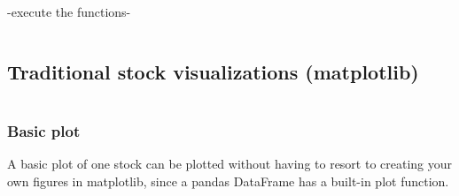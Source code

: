 \documentclass[12pt, a4paper]{article}
\begin{document}

-execute the functions-

\bgroup
  \inputminted[linenos, breaklines=true, fontsize=\scriptsize, firstnumber=last]{python}{src/stocks/etl/3_executing.py}
  \label{listing:setl_3}
\egroup

\newpage
\subsection{Traditional stock visualizations (matplotlib)}


\bgroup
  \inputminted[linenos, breaklines=true, fontsize=\scriptsize, ]{python}{src/stocks/simple/1_get_data.py}
  \label{listing:ssimp_1}
\egroup

\subsubsection{Basic plot}

A basic plot of one stock can be plotted without having to resort to creating your own figures in matplotlib, since a pandas DataFrame has a built-in plot function.

\bgroup
  \inputminted[linenos, breaklines=true, fontsize=\scriptsize, firstnumber=last]{python}{src/stocks/simple/2_onestock.py}
  \label{listing:ssimp_2}
\egroup
\end{document}
